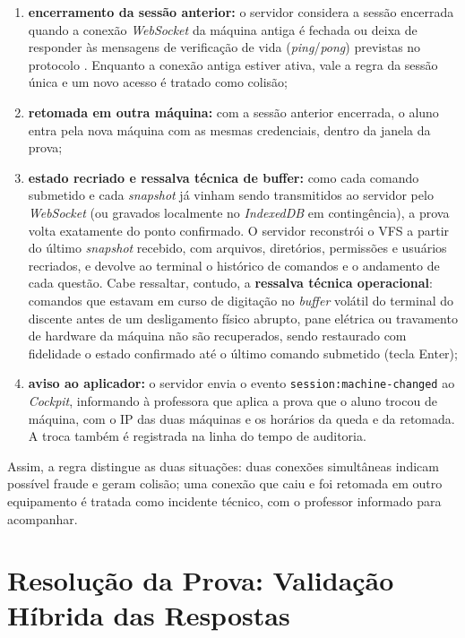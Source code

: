 \begin{enumerate}
    \item \textbf{encerramento da sessão anterior:} o servidor considera a sessão encerrada quando a conexão \textit{WebSocket} da máquina antiga é fechada ou deixa de responder às mensagens de verificação de vida (\textit{ping}/\textit{pong}) previstas no protocolo \cite{fette2011websocket}. Enquanto a conexão antiga estiver ativa, vale a regra da sessão única e um novo acesso é tratado como colisão;
    \item \textbf{retomada em outra máquina:} com a sessão anterior encerrada, o aluno entra pela nova máquina com as mesmas credenciais, dentro da janela da prova;
    \item \textbf{estado recriado e ressalva técnica de buffer:} como cada comando submetido e cada \textit{snapshot} já vinham sendo transmitidos ao servidor pelo \textit{WebSocket} (ou gravados localmente no \textit{IndexedDB} em contingência), a prova volta exatamente do ponto confirmado. O servidor reconstrói o VFS a partir do último \textit{snapshot} recebido, com arquivos, diretórios, permissões e usuários recriados, e devolve ao terminal o histórico de comandos e o andamento de cada questão. Cabe ressaltar, contudo, a \textbf{ressalva técnica operacional}: comandos que estavam em curso de digitação no \textit{buffer} volátil do terminal do discente antes de um desligamento físico abrupto, pane elétrica ou travamento de hardware da máquina não são recuperados, sendo restaurado com fidelidade o estado confirmado até o último comando submetido (tecla Enter);
    \item \textbf{aviso ao aplicador:} o servidor envia o evento \texttt{session:machine-changed} ao \textit{Cockpit}, informando à professora que aplica a prova que o aluno trocou de máquina, com o IP das duas máquinas e os horários da queda e da retomada. A troca também é registrada na linha do tempo de auditoria.
\end{enumerate}

Assim, a regra distingue as duas situações: duas conexões simultâneas indicam possível fraude e geram colisão; uma conexão que caiu e foi retomada em outro equipamento é tratada como incidente técnico, com o professor informado para acompanhar.

\section{Resolução da Prova: Validação Híbrida das Respostas}
\label{sec:validacao-desacoplada}

